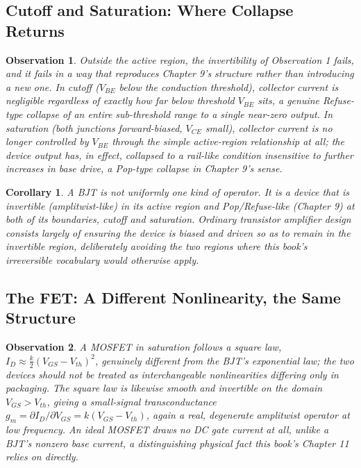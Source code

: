 \documentclass[12pt]{article}
\newtheorem{corollary}{Corollary}
\newtheorem{observation}{Observation}
\begin{document}
\subsection{Cutoff and Saturation: Where Collapse Returns}

\begin{observation}
Outside the active region, the invertibility of Observation 1 fails, and it fails in a way that reproduces Chapter 9's structure rather than introducing a new one. In cutoff ($V_{BE}$ below the conduction threshold), collector current is negligible regardless of exactly how far below threshold $V_{BE}$ sits, a genuine Refuse-type collapse of an entire sub-threshold range to a single near-zero output. In saturation (both junctions forward-biased, $V_{CE}$ small), collector current is no longer controlled by $V_{BE}$ through the simple active-region relationship at all; the device output has, in effect, collapsed to a rail-like condition insensitive to further increases in base drive, a Pop-type collapse in Chapter 9's sense.
\end{observation}

\begin{corollary}
A BJT is not uniformly one kind of operator. It is a device that is invertible (amplitwist-like) in its active region and Pop/Refuse-like (Chapter 9) at both of its boundaries, cutoff and saturation. Ordinary transistor amplifier design consists largely of ensuring the device is biased and driven so as to remain in the invertible region, deliberately avoiding the two regions where this book's irreversible vocabulary would otherwise apply.
\end{corollary}

\subsection{The FET: A Different Nonlinearity, the Same Structure}

\begin{observation}
A MOSFET in saturation follows a square law, $I_D \approx \tfrac{k}{2}(V_{GS}-V_{th})^2$, genuinely different from the BJT's exponential law; the two devices should not be treated as interchangeable nonlinearities differing only in packaging. The square law is likewise smooth and invertible on the domain $V_{GS} > V_{th}$, giving a small-signal transconductance $g_m = \partial I_D/\partial V_{GS} = k(V_{GS}-V_{th})$, again a real, degenerate amplitwist operator at low frequency. An ideal MOSFET draws no DC gate current at all, unlike a BJT's nonzero base current, a distinguishing physical fact this book's Chapter 11 relies on directly.
\end{observation}
\end{document}
